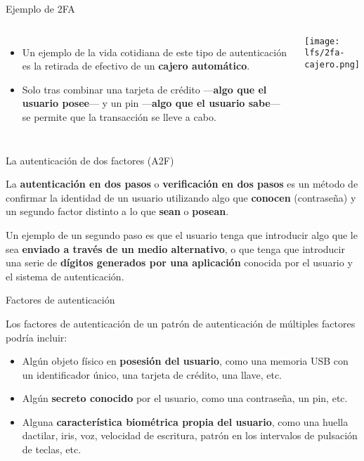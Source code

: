\begin{frame}[c]{Ejemplo de 2FA}
    \begin{columns}
        \begin{itemize}
          \item Un ejemplo de la vida cotidiana de este tipo de
            autenticación es la retirada de efectivo de un \textbf{cajero
            automático}.
          \pausa
          \item Solo tras combinar una tarjeta de crédito —\textbf{algo que
            el usuario posee}— y un pin —\textbf{algo que el usuario sabe}—
            se permite que la transacción se lleve a cabo.
        \end{itemize}
        \begin{center}
            \texttt{[image: lfs/2fa-cajero.png]}
        \end{center}
    \end{columns}
\end{frame}

\begin{frame}[c]{La autenticación de dos factores (A2F)}
  \begin{block}{}
      La \textbf{autenticación en dos pasos} o \textbf{verificación en
      dos pasos} es un método de confirmar la identidad de un usuario
      utilizando algo que \textbf{conocen} (contraseña) y un segundo
      factor distinto a lo que \textbf{sean} o \textbf{posean}.
  \end{block}

  \pausa
  \vspace{\baselineskip}
  Un ejemplo de un segundo paso es que el usuario tenga que introducir algo
  que le sea \textbf{enviado a través de un medio alternativo},
  o que tenga que introducir una serie de \textbf{dígitos generados por una
  aplicación} conocida por el usuario y el sistema de autenticación. 
\end{frame}

\begin{frame}[c]{Factores de autenticación}

  Los factores de autenticación de un patrón de autenticación de
  múltiples factores podría incluir:

  \vspace{\baselineskip}
  \begin{itemize}
    \item Algún objeto físico en \textbf{posesión del usuario}, como una
      memoria USB con un identificador único, una tarjeta de crédito,
      una llave, etc.

    \pausa
    \item Algún \textbf{secreto conocido} por el usuario, como una contraseña,
      un pin, etc.

    \pausa
    \item Alguna \textbf{característica biométrica propia del usuario},
      como una huella dactilar, iris, voz, velocidad de escritura,
      patrón en los intervalos de pulsación de teclas, etc.
  \end{itemize}
\end{frame}

